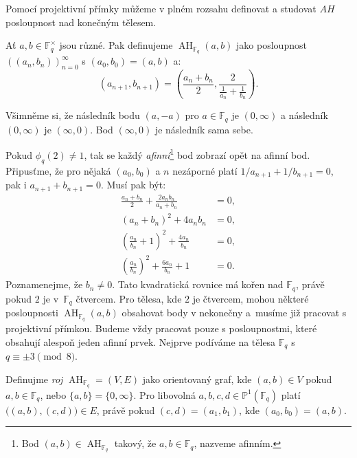\documentclass[12pt]{report}
\DeclareMathOperator{\AH}{AH}
\begin{document}
Pomocí projektivní přímky můžeme v plném rozsahu definovat a studovat $AH$ posloupnost nad konečným tělesem.

\begin{definice}
Ať $a,b \in \mathbb{F}_q ^{\times}$ jsou různé. Pak definujeme $\AH_{\mathbb{F}_q}(a,b)$ jako posloupnost $((a_n,b_n))_{n=0}^{\infty}$ s $(a_0,b_0) = (a,b)$ a:
\begin{equation*}
\left(a_{n+1},b_{n+1} \right) = \left(\frac{a_n+b_n}{2}, \frac{2}{\frac{1}{a_n} + \frac{1}{b_n}} \right).
\end{equation*}
\end{definice}

Všimněme si, že následník bodu $(a,-a)$ pro $a \in \mathbb{F}_q$ je $(0,\infty)$ a následník $(0,\infty)$ je $(\infty,0)$. Bod $(\infty,0)$ je následník sama sebe. 

Pokud $\phi_q(2) \neq 1$, tak se každý \textit{afinní}\footnote[3]{Bod $(a,b) \in \AH_{\mathbb{F}_q}$ takový, že $a,b \in \mathbb{F}_q$, nazveme afinním.} bod zobrazí opět na afinní bod. Připusťme, že pro nějaká $(a_0,b_0)$ a $n$ nezáporné platí $1/a_{n+1} + 1/b_{n+1} = 0$, pak i $a_{n+1} + b_{n+1} = 0$. Musí pak být:
\begin{align*}
\frac{a_n+b_n}{2} + \frac{2 a_n b_n}{a_n + b_n} &= 0,\\
(a_n+b_n)^2 + 4 a_n b_n &= 0,\\
\left(\frac{a_n}{b_n} + 1 \right)^2 + \frac{4a_n}{b_n} &= 0,\\
\left(\frac{a_n}{b_n}\right)^2 + \frac{6a_n}{b_n} + 1 &= 0.
\end{align*}
Poznamenejme, že $b_n \neq 0$. Tato kvadratická rovnice má kořen nad $\mathbb{F}_q$, právě pokud $2$ je v~$\mathbb{F}_q$ čtvercem. Pro tělesa, kde $2$ je čtvercem, mohou některé posloupnosti $\AH_{\mathbb{F}_q}(a,b)$ obsahovat body v nekonečny a~musíme již pracovat s projektivní přímkou. Budeme vždy pracovat pouze s posloupnostmi, které obsahují alespoň jeden afinní prvek. Nejprve podíváme na tělesa $\mathbb{F}_q$ s $q \equiv \pm 3 \pmod{8}$.

\begin{definice}
Definujme \textit{roj} $\AH_{\mathbb{F}_q} = (V,E)$ jako orientovaný graf, kde $(a,b) \in V$ pokud $a,b \in \mathbb{F}_q$, nebo $\lbrace a,b \rbrace = \lbrace 0,\infty \rbrace$. Pro libovolná $a,b,c,d \in \mathbb{P}^1 (\mathbb{F}_q)$ platí $\Big((a,b), (c,d) \Big) \in E$, právě pokud $(c,d) = (a_1,b_1)$, kde $(a_0,b_0) = (a,b)$. 
\end{definice}
\end{document}
